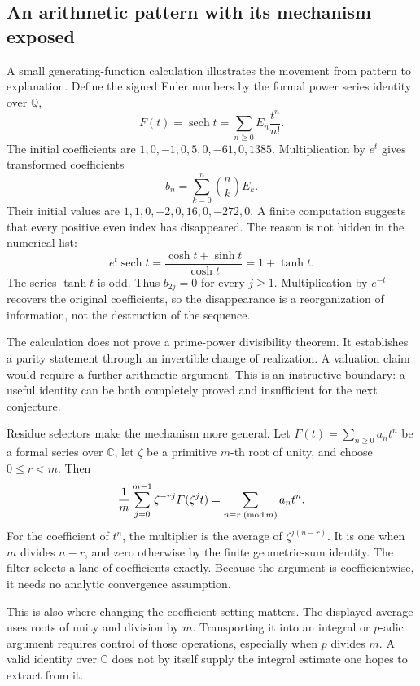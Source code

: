 \subsection{An arithmetic pattern with its mechanism exposed}

A small generating-function calculation illustrates the movement from pattern to explanation. Define the signed Euler numbers by the formal power series identity over \(\mathbb Q\),
\[
F(t)=\operatorname{sech}t=\sum_{n\geq0}E_n\frac{t^n}{n!}.
\]
The initial coefficients are \(1,0,-1,0,5,0,-61,0,1385\). Multiplication by \(e^t\) gives transformed coefficients
\[
b_n=\sum_{k=0}^n\binom nk E_k.
\]
Their initial values are \(1,1,0,-2,0,16,0,-272,0\). A finite computation suggests that every positive even index has disappeared. The reason is not hidden in the numerical list:
\[
e^t\operatorname{sech}t
=\frac{\cosh t+\sinh t}{\cosh t}
=1+\tanh t.
\]
The series \(\tanh t\) is odd. Thus \(b_{2j}=0\) for every \(j\geq1\). Multiplication by \(e^{-t}\) recovers the original coefficients, so the disappearance is a reorganization of information, not the destruction of the sequence.

The calculation does not prove a prime-power divisibility theorem. It establishes a parity statement through an invertible change of realization. A valuation claim would require a further arithmetic argument. This is an instructive boundary: a useful identity can be both completely proved and insufficient for the next conjecture.

Residue selectors make the mechanism more general. Let \(F(t)=\sum_{n\geq0}a_nt^n\) be a formal series over \(\mathbb C\), let \(\zeta\) be a primitive \(m\)-th root of unity, and choose \(0\leq r<m\). Then
\[
\frac1m\sum_{j=0}^{m-1}\zeta^{-rj}F(\zeta^jt)
=\sum_{n\equiv r\;({\rm mod}\,m)}a_nt^n.
\]
For the coefficient of \(t^n\), the multiplier is the average of \(\zeta^{j(n-r)}\). It is one when \(m\) divides \(n-r\), and zero otherwise by the finite geometric-sum identity. The filter selects a lane of coefficients exactly. Because the argument is coefficientwise, it needs no analytic convergence assumption.

This is also where changing the coefficient setting matters. The displayed average uses roots of unity and division by \(m\). Transporting it into an integral or \(p\)-adic argument requires control of those operations, especially when \(p\) divides \(m\). A valid identity over \(\mathbb C\) does not by itself supply the integral estimate one hopes to extract from it.

